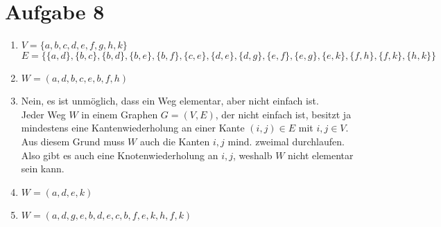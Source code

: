 \documentclass[12pt, a4paper]{article}
\begin{document}
\section*{Aufgabe 8}
\begin{enumerate}[label=\alph*)]
	\item $V=\{a,b,c,d,e,f,g,h,k\}$\\
		$E=\{\{a,d\},\{b,c\},\{b,d\},\{b,e\},\{b,f\},\{c,e\},\{d,e\},\{d,g\},\{e,f\},\{e,g\},\{e,k\},\{f,h\},\{f,k\},\{h,k\}\}$
	
	\item $W=(a,d,b,c,e,b,f,h)$
	
	\item Nein, es ist unmöglich, dass ein Weg elementar, aber nicht einfach ist.\\
		Jeder Weg $W$ in einem Graphen $G=(V,E)$, der nicht einfach ist, besitzt ja mindestens eine Kantenwiederholung an einer Kante $(i,j) \in E$ mit $i,j \in V$. Aus diesem Grund muss $W$ auch die Kanten $i,j$ mind. zweimal durchlaufen. Also gibt es auch eine Knotenwiederholung an $i,j$, weshalb $W$ nicht elementar sein kann.
		
	\item $W=(a,d,e,k)$
	
	\item $W=(a,d,g,e,b,d,e,c,b,f,e,k,h,f,k)$
\end{enumerate}



\newpage
\end{document}
